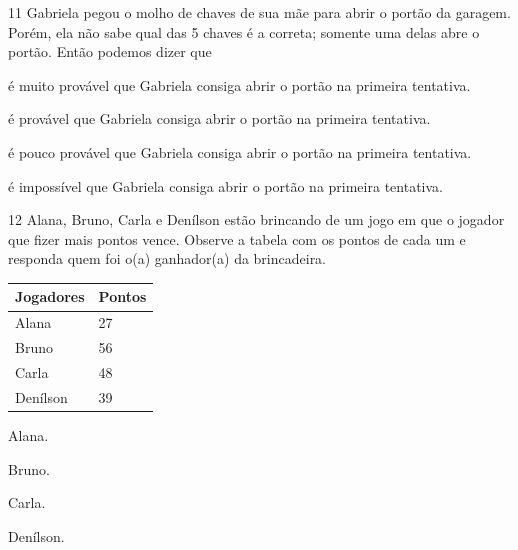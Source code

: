 \begin{escolha}
\begin{escolha}
\num{11} Gabriela pegou o molho de chaves de sua mãe para abrir o portão da
garagem. Porém, ela não sabe qual das 5 chaves é a correta; somente uma
delas abre o portão. Então podemos dizer que

\begin{escolha}
\item é muito provável que Gabriela consiga abrir o portão na primeira tentativa.

\item é provável que Gabriela consiga abrir o portão na primeira tentativa.

\item é pouco provável que Gabriela consiga abrir o portão na primeira tentativa.

\item é impossível que Gabriela consiga abrir o portão na primeira tentativa.
\end{escolha}




\num{12} Alana, Bruno, Carla e Denílson estão brincando de um jogo em que o
jogador que fizer mais pontos vence. Observe a tabela com os pontos de
cada um e responda quem foi o(a) ganhador(a) da brincadeira.

\begin{longtable}[]{@{}ll@{}}
\toprule
Jogadores & Pontos\tabularnewline
\midrule
\endhead
Alana & 27\tabularnewline
Bruno & 56\tabularnewline
Carla & 48\tabularnewline
Denílson & 39\tabularnewline
\bottomrule
\end{longtable}

\begin{minipage}{.5\textwidth}
\begin{escolha}
\item Alana.

\item Bruno.

\item Carla.

\item Denílson.
\end{escolha}
\end{minipage}
\end{escolha}
\end{escolha}
